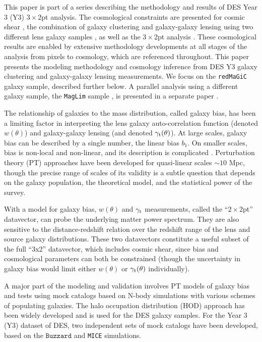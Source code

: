 \documentclass[aps, prd,twocolumn,superscriptaddress,nofootinbib,preprintnumbers]{revtex4-1}
\newcommand{\redmagic}{\texttt{redMaGiC} }
\newcommand{\mice}{\texttt{MICE} }
\newcommand{\maglim}{\texttt{MagLim} }
\newcommand{\buzzard}{\texttt{Buzzard} }
\begin{document}
This paper is part of a series describing the methodology and results of DES Year 3 (Y3) $3\times2$pt analysis. The cosmological constraints are presented for cosmic shear \citep{y3-cosmicshear1,y3-cosmicshear2}, the combination of galaxy clustering and galaxy-galaxy lensing using two different lens galaxy samples \citep[this paper; ][]{y3-2x2ptaltlensresults,y3-2x2ptmagnification}, as well as the $3\times2$pt analysis \citep{y3-3x2ptkp}. These cosmological results are enabled by extensive methodology developments at all stages of the analysis from pixels to cosmology, which are referenced throughout. This paper presents the modeling methodology and cosmology inference from DES Y3 galaxy clustering \citep{y3-galaxyclustering} and galaxy-galaxy lensing \citep{y3-gglensing} measurements. 
We focus on the \redmagic \citep{Rozo_2016} galaxy sample, described further below. A parallel analysis using a different galaxy sample, the \maglim sample \citep{y3-2x2maglimforecast}, is presented in a separate paper \citep{y3-2x2ptaltlensresults}.


The relationship of galaxies to the mass distribution, called galaxy bias, has been a limiting factor in interpreting the lens galaxy auto-correlation function (denoted $w(\theta)$) and galaxy-galaxy lensing (and denoted $\gamma_{\rm t}(\theta)$). At large scales, galaxy bias can be described by a single number, the linear bias $b_1$. On smaller scales, bias is non-local and non-linear, and its description is complicated \citep{Fry_93,Scherrer_98}. Perturbation theory (PT) approaches have been developed for quasi-linear scales $\sim 10$ Mpc, though the precise range of scales of its validity is a subtle question that depends on the galaxy population, the theoretical model, and the statistical power of the survey. 

With a model for galaxy bias, $w(\theta)$ and $\gamma_{\rm t}$ measurements, called the ``$2\times2$pt'' datavector, can probe the underlying matter power spectrum. They are also sensitive to the distance-redshift relation over the redshift range of the lens and source galaxy distributions.  These two datavectors constitute a useful subset of the full ``3x2'' datavector, which includes cosmic shear, since bias and cosmological parameters can both be constrained (though the uncertainty in galaxy bias would limit either $w(\theta)$ or $\gamma_{\rm t}(\theta)$ individually). 


A major part of the modeling and validation involves PT models of galaxy bias and tests using mock catalogs based on N-body simulations with various schemes of populating galaxies. The halo occupation distribution (HOD) approach has been widely developed and is used for the DES galaxy samples. For the Year 3 (Y3) dataset of DES, two independent sets of mock catalogs have been developed, based on the $\buzzard$ and \mice simulations. 
\end{document}
